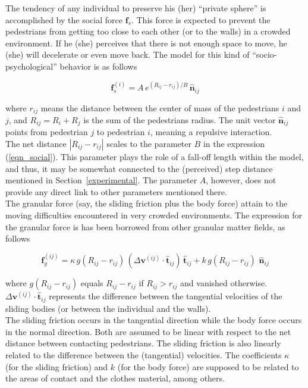\documentclass[preprint,12pt]{elsarticle}
\begin{document}
The tendency of any individual to preserve his (her) ``private sphere'' is 
accomplished by the social force $\mathbf{f}_s$. This force is expected to 
prevent the pedestrians from getting too close to each other (or to the walls) 
in a crowded environment. If he (she) perceives that there is not enough space 
to move, he (she) will decelerate or even move back. The model for this kind of 
``socio-psychological'' behavior is as follows

\begin{equation}
 \mathbf{f}_s^{(i)}=A\,e^{(R_{ij}-r_{ij})/B}\,\hat{\mathbf{n}}_{ij}
 \label{eqn_social}
\end{equation}

\noindent where $r_{ij}$ means the distance between the center of mass of the 
pedestrians $i$ and $j$, and $R_{ij}=R_i+R_j$ is the sum of the pedestrians 
radius. The unit vector $\hat{\mathbf{n}}_{ij}$ points from pedestrian $j$ to 
pedestrian $i$, meaning a repulsive interaction.\\ 

The net distance $|R_{ij}-r_{ij}|$ scales to the parameter $B$ in the 
expression (\ref{eqn_social}). This parameter plays the role of a fall-off 
length within the model, and thus, it may be somewhat connected to the 
(perceived) step distance mentioned in Section~\ref{experimental}. The 
parameter $A$, however, does not provide any direct link to other parameters 
mentioned there. \\    

The granular force (say, the sliding friction plus the body force) attain to 
the moving difficulties encountered in very crowded environments. The 
expression for the granular force is has been borrowed from other granular 
matter fields, as follows

\begin{equation}
 \mathbf{f}_g^{(ij)}=\kappa\,g(R_{ij}-r_{ij})\,
(\Delta\mathbf{v}^{(ij)}\cdot\hat{\mathbf{t}}_{ij})\,\hat{\mathbf{t}}_{ij}+
k\,g(R_{ij}-r_{ij})\,
\,\hat{\mathbf{n}}_{ij}\label{eqn_friction}
\end{equation}

\noindent where $g(R_{ij}-r_{ij})$ equals $R_{ij}-r_{ij}$ if $R_{ij}>r_{ij}$ and 
vanished otherwise. $\Delta\mathbf{v}^{(ij)}\cdot\hat{\mathbf{t}}_{ij}$ 
represents the difference between the tangential velocities of the sliding 
bodies (or between the individual and the walls).    \\

The sliding friction occurs in the tangential direction while the body force 
occurs in the normal direction. Both are assumed to be linear with respect to 
the net distance between contacting pedestrians. The sliding friction is also 
linearly related to the difference between the (tangential) velocities. The 
coefficients $\kappa$ (for the sliding friction) and $k$ (for the 
body force) are supposed to be related to the areas of contact and the clothes 
material, among others. \\
\end{document}
